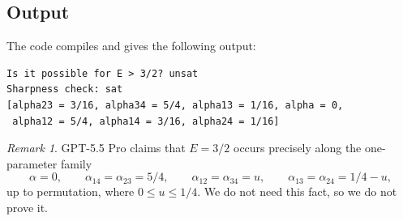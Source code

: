 \documentclass[reqno, 12pt]{amsart}
\theoremstyle{plain}
\theoremstyle{definition}
\theoremstyle{remark}
\newtheorem*{remark}{Remark}
\renewcommand{\le}{\leqslant}
\begin{document}
\subsection*{Output}
The code compiles and gives the following output:
\begin{tiny}
\begin{verbatim}
Is it possible for E > 3/2? unsat
Sharpness check: sat
[alpha23 = 3/16, alpha34 = 5/4, alpha13 = 1/16, alpha = 0,
 alpha12 = 5/4, alpha14 = 3/16, alpha24 = 1/16]
\end{verbatim}
\end{tiny}

\begin{remark}
GPT-5.5 Pro claims that $E = 3/2$ occurs precisely
along the one-parameter family
\[
\alpha=0,
\qquad
\alpha_{14}=\alpha_{23}=5/4,
\qquad
\alpha_{12}=\alpha_{34}=u,
\qquad \alpha_{13}=\alpha_{24}=1/4-u,
\]
up to permutation,
where $0\le u\le 1/4$.
We do not need this fact, so we do not prove it.
\end{remark}
\end{document}
